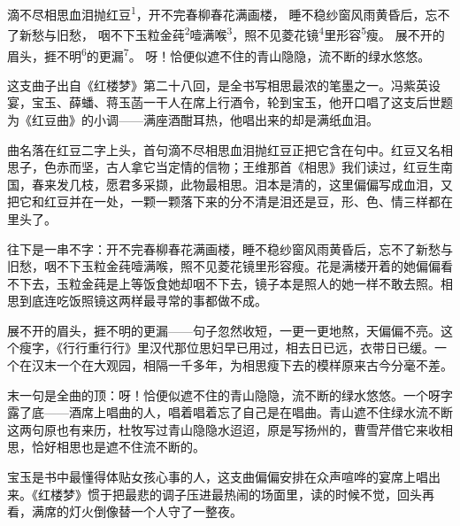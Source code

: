 
\begin{poem}
滴不尽相思血泪抛红豆\textsuperscript{1}，开不完春柳春花满画楼，
睡不稳纱窗风雨黄昏后，忘不了新愁与旧愁，
咽不下玉粒金莼\textsuperscript{2}噎满喉\textsuperscript{3}，照不见菱花镜\textsuperscript{4}里形容\textsuperscript{5}瘦。
展不开的眉头，捱不明\textsuperscript{6}的更漏\textsuperscript{7}。
呀！恰便似遮不住的青山隐隐，流不断的绿水悠悠。
\end{poem}

\begin{annotations}
\end{annotations}

\begin{appreciation}
这支曲子出自《红楼梦》第二十八回，是全书写相思最浓的笔墨之一。冯紫英设宴，宝玉、薛蟠、蒋玉菡一干人在席上行酒令，轮到宝玉，他开口唱了这支后世题为《红豆曲》的小调——满座酒酣耳热，他唱出来的却是满纸血泪。

曲名落在红豆二字上头，首句滴不尽相思血泪抛红豆正把它含在句中。红豆又名相思子，色赤而坚，古人拿它当定情的信物；王维那首《相思》我们读过，红豆生南国，春来发几枝，愿君多采撷，此物最相思。泪本是清的，这里偏偏写成血泪，又把它和红豆并在一处，一颗一颗落下来的分不清是泪还是豆，形、色、情三样都在里头了。

往下是一串不字：开不完春柳春花满画楼，睡不稳纱窗风雨黄昏后，忘不了新愁与旧愁，咽不下玉粒金莼噎满喉，照不见菱花镜里形容瘦。花是满楼开着的她偏偏看不下去，玉粒金莼是上等饭食她却咽不下去，镜子本是照人的她一样不敢去照。相思到底连吃饭照镜这两样最寻常的事都做不成。

展不开的眉头，捱不明的更漏——句子忽然收短，一更一更地熬，天偏偏不亮。这个瘦字，《行行重行行》里汉代那位思妇早已用过，相去日已远，衣带日已缓。一个在汉末一个在大观园，相隔一千多年，为相思瘦下去的模样原来古今分毫不差。

末一句是全曲的顶：呀！恰便似遮不住的青山隐隐，流不断的绿水悠悠。一个呀字露了底——酒席上唱曲的人，唱着唱着忘了自己是在唱曲。青山遮不住绿水流不断这两句原也有来历，杜牧写过青山隐隐水迢迢，原是写扬州的，曹雪芹借它来收相思，恰好相思也是遮不住流不断的。

宝玉是书中最懂得体贴女孩心事的人，这支曲偏偏安排在众声喧哗的宴席上唱出来。《红楼梦》惯于把最悲的调子压进最热闹的场面里，读的时候不觉，回头再看，满席的灯火倒像替一个人守了一整夜。
\end{appreciation}
